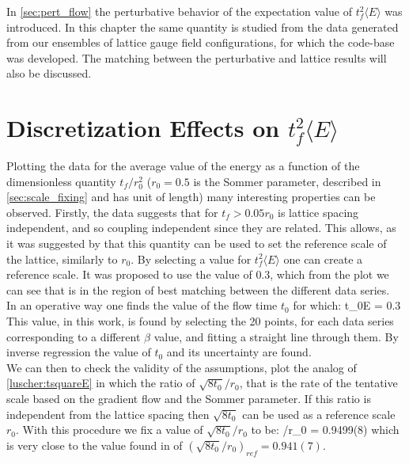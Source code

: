 In \cref{sec:pert_flow} the perturbative behavior of the expectation value of $t_f^2\langle E \rangle$ was introduced. In this chapter the same quantity is studied from the data generated from our ensembles of lattice gauge field configurations, for which the code-base was developed. The matching between the perturbative and lattice results will also be discussed.

\section{Discretization Effects on $t_f^2\langle E \rangle$}
\label{sec:scale}
Plotting the data for the average value of the energy as a function of the dimensionless quantity $t_f/r_0^2$ ($r_0=0.5$ is the Sommer parameter, described in \cref{sec:scale_fixing} and has unit of length) many interesting properties can be observed.
Firstly, the data suggests that for $t_f > 0.05r_0$ is lattice spacing independent, and so coupling independent since they are related. This allows, as it was suggested by \cite{luscher_properties_2010} that this quantity can be used to set the reference scale of the lattice, similarly to $r_0$. By selecting a value for $t_f^2\langle E \rangle$ one can create a reference scale. It was proposed to use the value of $0.3$, which from the plot we can see that is in the region of best matching between the different data series.\\
In an operative way one finds the value of the flow time $t_0$ for which:
\beq
    t_0\langle E \rangle = 0.3
\eeq
This value, in this work, is found by selecting the 20 points, for each data series corresponding to a different $\beta$ value, and fitting a straight line through them. By inverse regression the value of $t_0$ and its uncertainty are found.\\
We can then to check the validity of the assumptions, plot the analog of \cref{luscher:tsquareE} in which the ratio of $\sqrt{8t_0}/r_0$, that is the rate of the tentative scale based on the gradient flow and the Sommer parameter. If this ratio is independent from the lattice spacing then $\sqrt{8t_0}$ can be used as a reference scale $r_0$.
With this procedure we fix a value of $\sqrt{8t_0}/r_0$ to be:
\beq
{}/r_0 = 0.9499(8)
\eeq 
which is very close to the value found in \cite{ce_non-gaussianities_2015} of $(\sqrt{8t_0}/r_0)_{ref} = 0.941(7)$.

